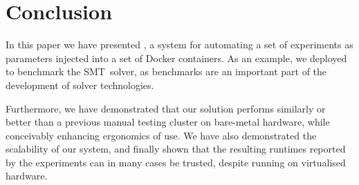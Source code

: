 \documentclass[a4paper]{IEEEtran}
\begin{document}
\section{Conclusion}

In this paper we have presented \testbench{}, a system for automating a set of
experiments as parameters injected into a set of Docker containers. As an
example, we deployed \testbench{} to benchmark the \uppsat{} SMT~solver, as
benchmarks are an important part of the development of solver technologies.

Furthermore, we have demonstrated that our solution performs similarly or better
than a previous manual testing cluster on bare-metal hardware, while conceivably
enhancing ergonomics of use. We have also demonstrated the scalability of our
system, and finally shown that the resulting runtimes reported by the
experiments can in many cases be trusted, despite running on virtualised
hardware.

\printbibliography
\end{document}
